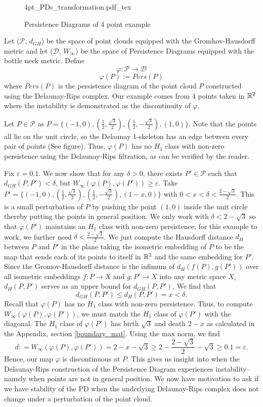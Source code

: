 \documentclass[letterpaper,titlepage]{article}
\newcommand{\incfig}[1]{%
    \def\svgwidth{\columnwidth}
    {#1.pdf_tex}
}
\begin{document}
\begin{figure}[ht]
    \centering
    \incfig{4pt_PDs_transformation}
    \caption{Persistence Diagrams of 4 point example}
    \label{fig:4pt_PDs_transformation}
\end{figure}


Let ($\mathcal{P}$, $d_{GH}$) be the space of point clouds equipped with the Gromhov-Hausdorff metric and let ($\mathcal{D}$, $W_\infty$) be the space of Persistence Diagrams equipped with the bottle neck metric. Define
$$\varphi: \mathcal{P} \to \mathcal{D}$$
$$\varphi(P):= Pers(P)$$
where $Pers(P)$ is the persistence diagram of the point cloud $P$ constructed using the Delaunay-Rips complex. Our example comes from 4 points taken in $\mathbb{R}^2$ where the instability is demonstrated as the discontinuity of $\varphi$.

Let $P \in \mathcal{P}$ as $P = \{(-1,0),(\frac{1}{2},\frac{\sqrt{3}}{2}),(\frac{1}{2},-\frac{\sqrt{3}}{2}),(1,0)\}.$ Note that the points all lie on the unit circle, so the Delaunay 1-skeleton has an edge between every pair of points (See figure). Thus, $\varphi(P)$ has no $H_1$ class with non-zero persistence using the Delaunay-Rips filtration, as can be verified by the reader.

Fix $\varepsilon=0.1$. We now show that for any $\delta > 0$, there exists $P' \in \mathcal{P}$ such that $d_{GH}(P,P')< \delta$, but $W_\infty(\varphi(P), \varphi(P')) \geq \varepsilon.$ Take $P' = \{(-1,0),(\frac{1}{2},\frac{\sqrt{3}}{2}),(\frac{1}{2},-\frac{\sqrt{3}}{2}),(1-x,0)\}$ with $0<x < \delta < \frac{2-\sqrt{3}}{2}$. This is a small perturbation of $P$ by pushing the point $(1,0)$ inside the unit circle thereby putting the points in general position. We only work with $\delta<2-\sqrt{3}$ so that $\varphi(P')$ maintains an $H_1$ class with non-zero persistence; for this example to work, we further need $\delta < \frac{2-\sqrt{3}}{2}$. We just compute the Hausdorff distance $d_H$ between $P$ and $P'$ in the plane taking the isometric embedding of $P$ to be the map that sends each of its points to itself in $\mathbb{R}^2$ and the same embedding for $P'$. Since the Gromov-Hausdorff distance is the infimum of $d_H(f(P),g(P'))$ over all isometric embeddings $f:P \to X$ and $g: P' \to X$ into any metric space $X$, $d_H(P,P')$ serves as an upper bound for $d_{GH}(P,P').$ We find that
$$d_{GH}(P,P')\leq d_H(P,P')=x<\delta.$$
Recall that $\varphi(P)$ has no $H_1$ class with non-zero persistence. Thus, to compute $W_\infty(\varphi(P),\varphi(P'))$, we must match the $H_1$ class of $\varphi(P')$ with the diagonal. The $H_1$ class of $\varphi(P')$ has birth $\sqrt{3}$ and death $2-x$ as calculated in the Appendix, section \ref{boundary_mat}. Using the max norm, we find
$$d: = W_\infty(\varphi(P),\varphi(P')) = 2-x-\sqrt{3} \geq 2-\frac{2-\sqrt{3}}{2} -\sqrt{3} \geq 0.1 = \varepsilon.$$
Hence, our map $\varphi$ is discontinuous at $P$. This gives us insight into when the Delaunay-Rips construction of the Persistence Diagram experiences instability--namely when points are not in general position. We now have motivation to ask if we have stability of the PD when the underlying Delaunay-Rips complex does not change under a perturbation of the point cloud.
\end{document}
